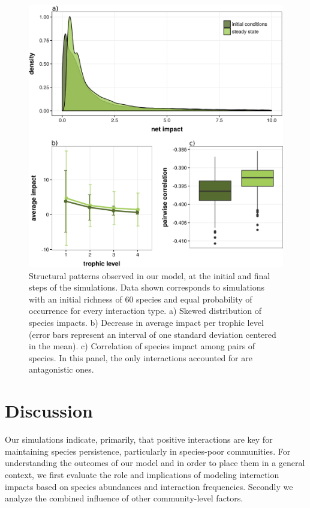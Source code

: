\begin{figure}[!ht]
\centering
\includegraphics[width=\textwidth]{./Figures/chapter03/Fig_4.png}
\caption[Community structural patterns]{\color{Gray} Structural patterns observed in our model, at the initial and final steps of the simulations. Data shown corresponds to simulations with an initial richness of 60 species and equal probability of occurrence for every interaction type. a) Skewed distribution of species impacts. b) Decrease in average impact per trophic level (error bars represent an interval of one standard deviation centered in the mean). c) Correlation of species impact among pairs of species. In this panel, the only interactions accounted for are antagonistic ones.}
\label{fig:fig3.4}
\end{figure}

\section{Discussion}

Our simulations indicate, primarily, that positive interactions are key for maintaining species persistence, particularly in species-poor communities. For understanding the outcomes of our model and in order to place them in a general context, we first evaluate the role and implications of modeling interaction impacts based on species abundances and interaction frequencies. Secondly we analyze the combined influence of other community-level factors.

